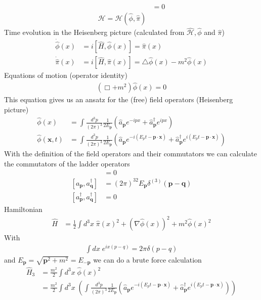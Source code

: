 \documentclass[10pt,a4paper]{report}
\theoremstyle{definition}
\begin{document}
\begin{enumerate}[a)]
\begin{align}
[\hat{\pi}(\mathbf{x},t),\hat{\pi}(\mathbf{y},t)]&=0\\
\mathcal{H}=\mathcal{H}(\hat{\phi},\hat{\pi})
\end{align}
Time evolution in the Heisenberg picture (calculated from $\hat{\mathcal{H}}, \hat{\phi}$ and $\hat{\pi}$)
\begin{align}
\dot{\hat{\phi}}(x)&=i[\hat{H},\hat{\phi}(x)]=\hat{\pi}(x)\\
\dot{\hat{\pi}}(x)&=i[\hat{H},\hat{\pi}(x)]=\triangle\hat{\phi}(x)-m^2\hat{\phi}(x)
\end{align} 
Equations of motion (operator identity)
\begin{align}
(\Box+m^2)\hat{\phi}(x)=0
\end{align}
This equation gives us an ansatz for the (free) field operators (Heisenberg picture)
\begin{align}
\hat\phi(x)
&=\int \frac{d^3p}{(2\pi)^3}\frac{1}{2E_\mathbf{p}}
(\hat{a}_\mathbf{p}e^{-ipx}
+\hat{a}_\mathbf{p}^\dagger e^{ipx})\\
\hat\phi(\mathbf{x},t)
&=\int \frac{d^3p}{(2\pi)^3}\frac{1}{2E_\mathbf{p}}
(\hat{a}_\mathbf{p}e^{-i(E_pt-\mathbf{p\cdot x})}
+\hat{a}_\mathbf{p}^\dagger e^{i(E_pt-\mathbf{p\cdot x})})
\end{align}
With the definition of the field operators and their commutators we can calculate the commutators of the ladder operators
\begin{align}
[a_\mathbf{p},a_\mathbf{q}]&=0\\
[a_\mathbf{p},a^\dagger_\mathbf{q}]&=(2\pi)^32E_\mathbf{p}\delta^{(3)}(\mathbf{p}-\mathbf{q})\\
[a^\dagger_\mathbf{p},a^\dagger_\mathbf{q}]&=0
\end{align}
Hamiltonian
\begin{align}
\hat{H}
&=\frac{1}{2}\int d^3x\;\hat\pi(x)^2+(\nabla\hat\phi(x))^2+m^2\hat\phi(x)^2
\end{align}
With
\begin{align}
\int dx\;e^{ix(p-q)}=2\pi\delta(p-q)
\end{align}
and $E_\mathbf{p}=\sqrt{\mathbf{p}^2+m^2}=E_\mathbf{-p}$ we can do a brute force calculation
\begin{align}
\hat{H}_3
&=\frac{m^2}{2}\int d^3x\;\hat\phi(x)^2\\
&=\frac{m^2}{2}\int d^3x\;
\left(\int \frac{d^3p}{(2\pi)^3}\frac{1}{2E_\mathbf{p}}
(\hat{a}_\mathbf{p}e^{-i(E_pt-\mathbf{p\cdot x})}
+\hat{a}_\mathbf{p}^\dagger e^{i(E_pt-\mathbf{p\cdot x})})\right)
\\

\end{align}
\end{enumerate}
\end{document}
